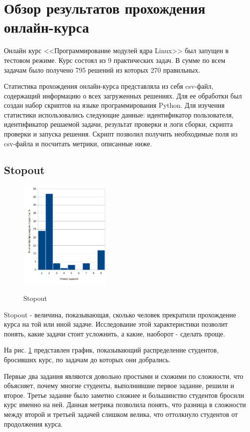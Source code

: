 \documentclass[a4paper,12pt]{article}
\begin{document}
\section{Обзор результатов прохождения онлайн-курса}
Онлайн курс <<Программирование модулей ядра Linux>> был запущен в тестовом режиме. Курс состоял из 9 практических задач. В сумме по всем задачам было получено 795 решений из которых 270 правильных.

Статистика прохождения онлайн-курса представляла из себя csv-файл, содержащий информацию о всех загруженных решениях. Для ее обработки был создан набор скриптов на языке программирования Python\cite{python}. Для изучения статистики использовались следующие данные: идентификатор пользователя, идентификатор решаемой задачи, результат проверки и логи сборки, скрипта проверки и запуска решения. Скрипт позволил получить необходимые поля из csv-файла и посчитать метрики, описанные ниже.

\subsection{Stopout}

\begin{figure}
	\caption{Stopout}
	\centering
	\includegraphics[width=0.4\textwidth]{stopout.png}
	\label{fig:mesh2}
\end{figure}

Stopout\cite{stopout}\cite{likelytostop} - величина, показывающая, сколько человек прекратили прохождение курса на той или иной задаче. Исследование этой характеристики позволит понять, какие задачи стоит усложнить, а какие, наоборот - сделать проще.

На рис. \ref{fig:mesh2} представлен график, показывающий распределение студентов, бросивших курс, по задачам до которых они добрались.

Первые два задания являются довольно простыми и схожими по сложности, что объясняет, почему многие студенты, выполнившие первое задание, решили и второе. Третье задание было заметно сложнее и большинство студентов бросили курс именно на ней. Данная метрика позволила понять, что разница в сложности между второй и третьей задачей слишком велика, что оттолкнуло студентов от продолжения курса.
\end{document}
